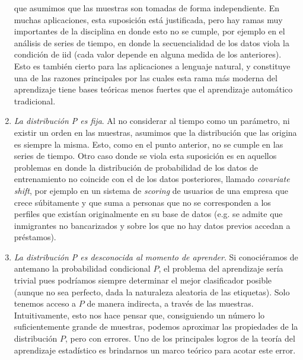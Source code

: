 \documentclass{article}
\begin{document}
\begin{enumerate}
    que asumimos que las muestras son tomadas de forma independiente. En muchas aplicaciones, esta suposición está justificada, pero
    hay ramas muy importantes de la disciplina en donde esto no se cumple, por ejemplo en el análisis de series de tiempo, en donde
    la secuencialidad de los datos viola la condición de iid (cada valor depende en alguna medida de los anteriores). Esto es también 
    cierto para las aplicaciones a lenguaje natural, y constituye una de las razones principales por las cuales esta rama más moderna 
    del aprendizaje tiene bases teóricas menos fuertes que el aprendizaje automático tradicional.
    \item \textit{La distribución P es fija}. Al no considerar al tiempo como un parámetro, ni existir un orden en las muestras, asumimos
    que la distribución que las origina es siempre la misma. Esto, como en el punto anterior, no se cumple en las series de tiempo. Otro
    caso donde se viola esta suposición es en aquellos problemas en donde la distribución de probabilidad de los datos de entrenamiento no
    coincide con el de los datos posteriores, llamado \textit{covariate shift}, por ejemplo en un sistema de \textit{scoring} de usuarios
    de una empresa que crece súbitamente y que suma a personas que no se corresponden a los perfiles que existían originalmente en su base
    de datos (e.g. se admite que inmigrantes no bancarizados y sobre los que no hay datos previos accedan a préstamos).
    \item \textit{La distribución P es desconocida al momento de aprender}. Si conociéramos de antemano la probabilidad condicional $P$,
    el problema del aprendizaje sería trivial pues podríamos siempre determinar el mejor clasificador posible (aunque no sea perfecto,
    dada la naturaleza aleatoria de las etiquetas). Solo tenemos acceso a $P$ de manera indirecta, a través de las muestras. Intuitivamente,
    esto nos hace pensar que, consiguiendo un número lo suficientemente grande de muestras, podemos aproximar las propiedades de la distribución
    $P$, pero con errores. Uno de los principales logros de la teoría del aprendizaje estadístico es brindarnos un marco teórico para
    acotar este error.
\end{enumerate}
\end{document}

